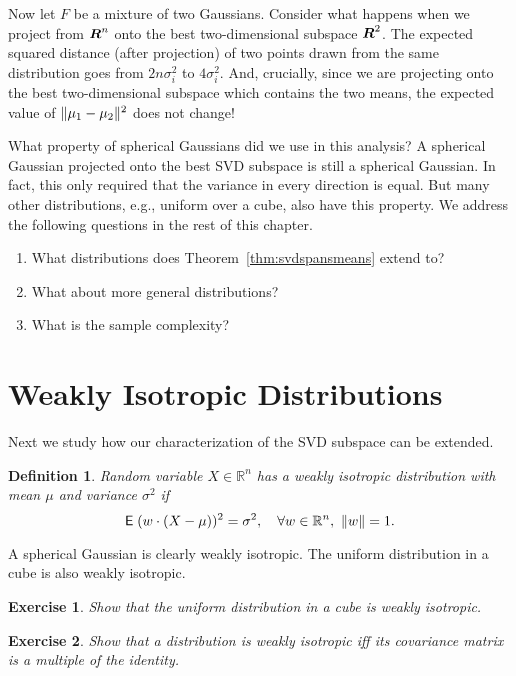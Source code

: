 \documentclass{book}
\newtheorem{definition}[theorem]{Definition}
\newtheorem{exercise}{Exercise}
\numberwithin{exercise}{chapter}
\begin{document}
Now let $F$ be a mixture of two Gaussians.  Consider what
happens when we project from $\mbox{\mbox{\boldmath $R$}}^n$ onto the best two-dimensional
subspace $\mbox{\mbox{\boldmath $R$}}^2$.  The expected squared distance (after projection) of two
points drawn from the same distribution goes from $2n\sigma_i^2$ to
$4\sigma_i^2$.  And, crucially, since we are projecting onto the best
two-dimensional subspace which contains the two means, the expected
value of $\|\mu_1-\mu_2\|^2$ does not change!

What property of spherical Gaussians did we use in this analysis?
A spherical Gaussian projected onto the best SVD subspace is
still a spherical Gaussian.  In fact, this only required that the
variance in every direction is equal.
But many other distributions, e.g., uniform over a cube, also have
this property. We address the following questions in the rest of this
chapter.
\begin{enumerate}
\item What distributions does Theorem~\ref{thm:svdspansmeans}
extend to?
\item What about more general distributions?
\item What is the sample complexity?
\end{enumerate}

\section{Weakly Isotropic Distributions}

Next we study how our characterization of the SVD subspace can be extended.

\begin{definition}
Random variable $X\in\mathbb R^n$ has a {\em weakly isotropic} distribution with mean $\mu$ and
variance $\sigma^2$
if
\[\hbox{{\sf E}\;}{(w\cdot (X-\mu))^2}=\sigma^2,\quad\forall w\in\mathbb R^n,~\|w\|=1.\]
\end{definition}

 A spherical Gaussian is clearly weakly isotropic. The uniform distribution in a cube is also weakly isotropic.

\begin{exercise}
Show that the uniform distribution in a cube is weakly isotropic.
\end{exercise}

\begin{exercise}
Show that a distribution is weakly isotropic iff its covariance matrix is a multiple
of the identity.
\end{exercise}
\end{document}
